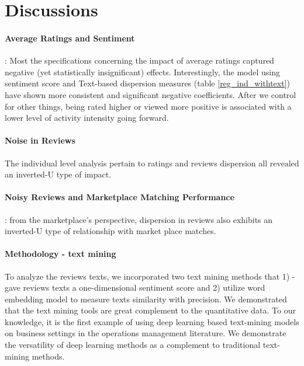 \documentclass[msom,blindrev]{informs3}
\begin{document}
	
	
	
	
	
	
	
	
	\section{Discussions}
	
	\paragraph{Average Ratings and Sentiment} : Most the specifications concerning the impact of average ratings captured negative (yet statistically insignificant) effects.  Interestingly, the model using sentiment score and Text-based dispersion measures (table \ref{reg_ind_withtext}) have shown more consistent and significant negative coefficients. After we control for other things, being rated higher or viewed more positive is associated with a lower level of activity intensity going forward. \\
	
	\paragraph{Noise in Reviews} The individual level analysis pertain to ratings and reviews dispersion all revealed an inverted-U type of impact.
	
	\paragraph{Noisy Reviews and Marketplace Matching Performance}: from the marketplace's perspective, dispersion in reviews also exhibits an inverted-U type of relationship with market place matches.
	
	\paragraph{Methodology - text mining} To analyze the reviews texts, we incorporated two text mining methods that 1) - gave reviews texts a one-dimensional sentiment score and 2) utilize word embedding model to measure texts similarity with precision. We demonstrated that the text mining tools are great complement to the quantitative data. To our knowledge, it is the first example of using deep learning based text-mining models on business settings in the operations management literature. We demonstrate the versatility of deep learning methods as a complement to traditional text-mining methods.
	
\end{document}
